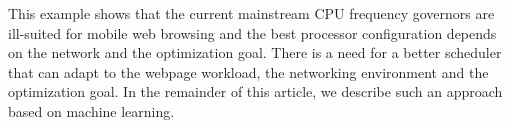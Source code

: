  This example shows that the current mainstream CPU frequency governors are ill-suited for mobile web browsing
and the best processor configuration depends on the network and the optimization goal. There is a need for a better scheduler that can
adapt to the webpage workload, the networking environment and the optimization goal. In the remainder of this article, we describe such an
approach based on machine learning.
